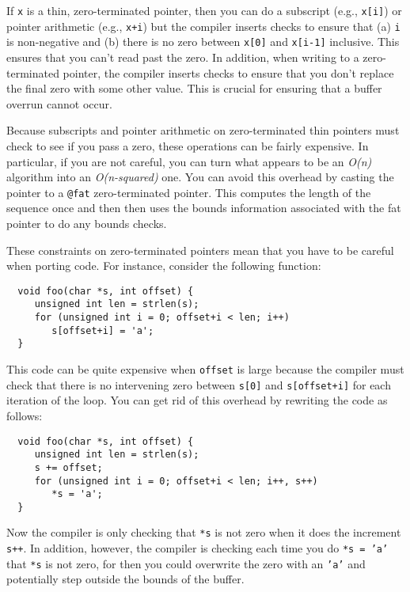 If \texttt{x} is a thin, zero-terminated pointer, then you can
do a subscript (e.g., \texttt{x[i]}) or pointer arithmetic
(e.g., \texttt{x+i}) but the compiler inserts checks
to ensure that (a) \texttt{i} is non-negative and (b) there is no
zero between \texttt{x[0]} and \texttt{x[i-1]} inclusive.
This ensures that you can't read past the zero.  
In addition, when writing to a zero-terminated pointer, the
compiler inserts checks to ensure that you don't replace
the final zero with some other value.  This is crucial for
ensuring that a buffer overrun cannot occur.  

Because subscripts and pointer arithmetic on zero-terminated
thin pointers must check to see if you pass a zero, these operations
can be fairly expensive.  In particular, if you are not careful,
you can turn what appears to be an \emph{O(n)} algorithm into
an \emph{O(n-squared)} one.  You can avoid this overhead by
casting the pointer to a \texttt{@fat} zero-terminated pointer.  This
computes the length of the sequence once and then then uses
the bounds information associated with the fat pointer to do
any bounds checks.  

These constraints on zero-terminated pointers mean that you
have to be careful when porting code.  For instance, consider
the following function:
\begin{verbatim}
  void foo(char *s, int offset) {
     unsigned int len = strlen(s);
     for (unsigned int i = 0; offset+i < len; i++)
        s[offset+i] = 'a';
  }
\end{verbatim}
This code can be quite expensive when \texttt{offset} is large
because the compiler must check that there is no intervening
zero between \texttt{s[0]} and \texttt{s[offset+i]} for each
iteration of the loop.  You can get rid of this overhead by
rewriting the code as follows:
\begin{verbatim}
  void foo(char *s, int offset) {
     unsigned int len = strlen(s);
     s += offset;
     for (unsigned int i = 0; offset+i < len; i++, s++)
        *s = 'a';
  }
\end{verbatim}
Now the compiler is only checking that \texttt{*s} is not
zero when it does the increment \texttt{s++}.  In addition,
however, the compiler is checking each time you do \texttt{*s = 'a'}
that \texttt{*s} is not zero, for then you could overwrite
the zero with an \texttt{'a'} and potentially step outside
the bounds of the buffer. 

